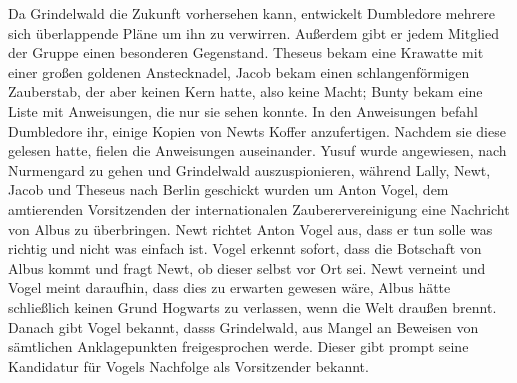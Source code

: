 \documentclass[a4paper, 10pt]{article}
\begin{document}
Da Grindelwald die Zukunft vorhersehen kann, entwickelt Dumbledore mehrere sich überlappende Pläne um ihn zu verwirren. Außerdem gibt er jedem Mitglied der Gruppe einen besonderen Gegenstand. Theseus bekam eine Krawatte mit einer großen goldenen Anstecknadel, Jacob bekam einen schlangenförmigen Zauberstab, der aber keinen Kern hatte, also keine Macht; Bunty bekam eine Liste mit Anweisungen, die nur sie sehen konnte. In den Anweisungen befahl Dumbledore ihr, einige Kopien von Newts Koffer anzufertigen. Nachdem sie diese gelesen hatte, fielen die Anweisungen auseinander. Yusuf wurde angewiesen, nach Nurmengard zu gehen und Grindelwald auszuspionieren, während Lally, Newt, Jacob und Theseus nach Berlin geschickt wurden um Anton Vogel, dem amtierenden Vorsitzenden der internationalen Zauberervereinigung eine Nachricht von Albus zu überbringen. Newt richtet Anton Vogel aus, dass er tun solle was richtig und nicht was einfach ist. Vogel erkennt sofort, dass die Botschaft von Albus kommt und fragt Newt, ob dieser selbst vor Ort sei. Newt verneint und Vogel meint daraufhin, dass dies zu erwarten gewesen wäre, Albus hätte schließlich keinen Grund Hogwarts zu verlassen, wenn die Welt draußen brennt. Danach gibt Vogel bekannt, dasss Grindelwald, aus Mangel an Beweisen von sämtlichen Anklagepunkten freigesprochen werde. Dieser gibt prompt seine Kandidatur für Vogels Nachfolge als Vorsitzender bekannt.
\end{document}
